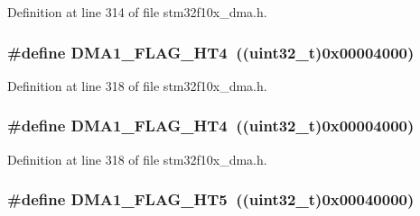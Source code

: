 Definition at line 314 of file stm32f10x\+\_\+dma.\+h.

\subsubsection[{\texorpdfstring{D\+M\+A1\+\_\+\+F\+L\+A\+G\+\_\+\+H\+T4}{DMA1_FLAG_HT4}}]{\setlength{\rightskip}{0pt plus 5cm}\#define D\+M\+A1\+\_\+\+F\+L\+A\+G\+\_\+\+H\+T4~(({\bf uint32\+\_\+t})0x00004000)}\hypertarget{group___d_m_a__flags__definition_ga12ad5a2c8cd9778fecf88d1dab7626d4}{}\label{group___d_m_a__flags__definition_ga12ad5a2c8cd9778fecf88d1dab7626d4}


Definition at line 318 of file stm32f10x\+\_\+dma.\+h.

\subsubsection[{\texorpdfstring{D\+M\+A1\+\_\+\+F\+L\+A\+G\+\_\+\+H\+T4}{DMA1_FLAG_HT4}}]{\setlength{\rightskip}{0pt plus 5cm}\#define D\+M\+A1\+\_\+\+F\+L\+A\+G\+\_\+\+H\+T4~(({\bf uint32\+\_\+t})0x00004000)}\hypertarget{group___d_m_a__flags__definition_ga12ad5a2c8cd9778fecf88d1dab7626d4}{}\label{group___d_m_a__flags__definition_ga12ad5a2c8cd9778fecf88d1dab7626d4}


Definition at line 318 of file stm32f10x\+\_\+dma.\+h.

\subsubsection[{\texorpdfstring{D\+M\+A1\+\_\+\+F\+L\+A\+G\+\_\+\+H\+T5}{DMA1_FLAG_HT5}}]{\setlength{\rightskip}{0pt plus 5cm}\#define D\+M\+A1\+\_\+\+F\+L\+A\+G\+\_\+\+H\+T5~(({\bf uint32\+\_\+t})0x00040000)}\hypertarget{group___d_m_a__flags__definition_ga648a2eb0b008ab009f03d207596c3cd7}{}\label{group___d_m_a__flags__definition_ga648a2eb0b008ab009f03d207596c3cd7}


